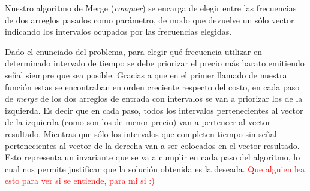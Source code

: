 \documentclass[a4paper]{article}
\begin{document}
Nuestro algoritmo de Merge (\emph{conquer}) se encarga de elegir entre las frecuencias de dos arreglos pasados como parámetro, de modo que devuelve un sólo vector indicando los intervalos ocupados por las frecuencias elegidas. 

Dado el enunciado del problema, para elegir qu\'e frecuencia utilizar en determinado intervalo de tiempo se debe priorizar el precio más barato emitiendo señal siempre que sea posible. Gracias a que en el primer llamado de nuestra funci\'on estas se encontraban en orden creciente respecto del costo, en cada paso de \emph{merge} de los dos arreglos de entrada con intervalos se van a priorizar los de la izquierda. Es decir que en cada paso, todos los intervalos pertenecientes al vector de la izquierda (como son los de menor precio) van a pertencer al vector resultado. Mientras que s\'olo los intervalos que completen tiempo sin se\~nal pertenecientes al vector de la derecha van a ser colocados en el vector resultado. Esto representa un invariante que se va a cumplir en cada paso del algoritmo, lo cual nos permite justificar que la soluci\'on obtenida es la deseada. \textcolor{red}{Que alguien lea esto para ver si se entiende, para mi si :)}\\
\end{document}

